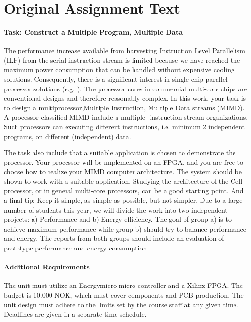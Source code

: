 \section{Original Assignment Text}
\paragraph{Task: Construct a Multiple Program, Multiple Data}
The performance increase available from harvesting Instruction Level Parallelism
(ILP) from the serial instruction stream is limited because we have reached the
maximum power consumption that can be handled without expensive cooling
solutions\cite{olukotun}. Consequently, there is a significant interest in single-chip
parallel processor solutions (e.g. \cite{bell,kongetira}). The processor cores in commercial
multi-core chips are conventional designs and therefore reasonably complex. In
this work, your task is to design a multiprocessor,Multiple Instruction,
Multiple Data streams (MIMD). A processor classified MIMD include a multiple-
instruction stream organizations\cite{flynn}. Such processors can executing different
instructions, i.e. minimum 2 independent programs, on different (independent)
data.

The task also include that a suitable application is chosen to demonstrate the
processor. Your processor will be implemented on an FPGA, and you are free to
choose how to realize your MIMD computer architecture. The system should be
shown to work with a suitable application. Studying the architecture of the
Cell processor\cite{wiki_cell_mpu}, or in general multi-core processors\cite{wiki_multicore}, can be a good
starting point. And a final tip; Keep it simple, as simple as possible, but not
simpler. Due to a large number of students this year, we will divide the work
into two independent projects: a) Performance and b) Energy efficiency. The goal
of group a) is to achieve maximum performance while group b) should try to
balance performance and energy. The reports from both groups should include an
evaluation of prototype performance and energy consumption.

\paragraph{Additional Requirements}
The unit must utilize an Energymicro micro controller and a Xilinx FPGA. The
budget is 10.000 NOK, which must cover components and PCB production. The unit
design must adhere to the limits set by the course staff at any given time.
Deadlines are given in a separate time schedule.

